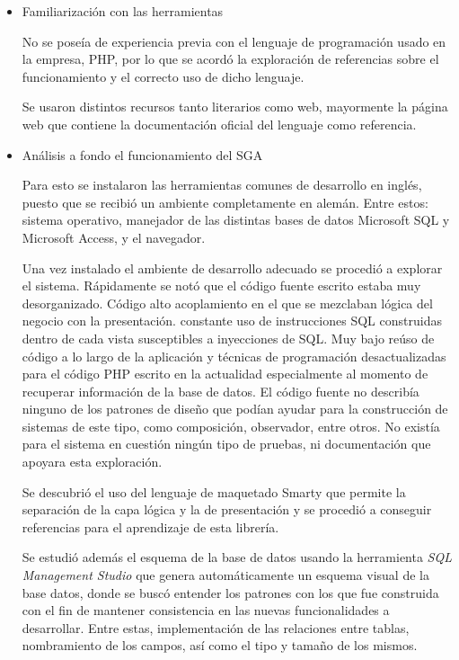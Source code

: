 \begin{itemize}
\item Familiarización con las herramientas

No se poseía de experiencia previa con el lenguaje de programación usado en la empresa, PHP, por lo que se acordó la exploración de referencias sobre el funcionamiento y el correcto uso de dicho lenguaje.

Se usaron distintos recursos tanto literarios como web, mayormente la página web que contiene la documentación oficial del lenguaje como referencia. \cite{bib:php}

\item Análisis a fondo el funcionamiento del SGA

Para esto se instalaron las herramientas comunes de desarrollo en inglés, puesto que se recibió un ambiente completamente en alemán. Entre estos: sistema operativo, manejador de las distintas bases de datos Microsoft SQL y Microsoft Access, y el navegador.

Una vez instalado el ambiente de desarrollo adecuado se procedió a explorar el sistema. Rápidamente se notó que el código fuente escrito estaba muy desorganizado. Código alto acoplamiento en el que se mezclaban lógica del negocio con la presentación. constante uso de instrucciones \gls{SQL} construidas dentro de cada vista susceptibles a inyecciones de \gls{SQL}. Muy bajo reúso de código a lo largo de la aplicación y técnicas de programación desactualizadas para el código PHP escrito en la actualidad especialmente al momento de recuperar información de la base de datos. El código fuente no describía ninguno de los patrones de diseño que podían ayudar para la construcción de sistemas de este tipo, como composición, observador, entre otros. No existía para el sistema en cuestión ningún tipo de pruebas, ni documentación que apoyara esta exploración.

Se descubrió el uso del lenguaje de maquetado Smarty que permite la separación de la capa lógica y la de presentación y se procedió a conseguir referencias para el aprendizaje de esta librería.

Se estudió además el esquema de la base de datos usando la herramienta \emph{SQL Management Studio} que genera automáticamente un esquema visual de la base datos, donde se buscó entender los patrones con los que fue construida con el fin de mantener consistencia en las nuevas funcionalidades a desarrollar. Entre estas, implementación de las relaciones entre tablas, nombramiento de los campos, así como el tipo y tamaño de los mismos.


\end{itemize}
